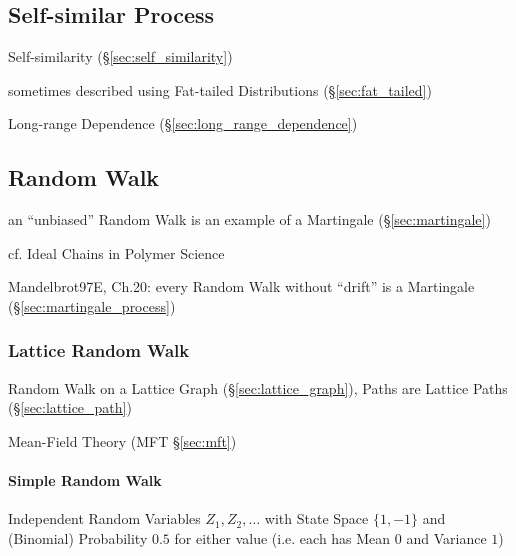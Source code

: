 \subsection{Self-similar Process}\label{sec:self_similar}

Self-similarity (\S\ref{sec:self_similarity})

sometimes described using Fat-tailed Distributions (\S\ref{sec:fat_tailed})

Long-range Dependence (\S\ref{sec:long_range_dependence})



\subsection{Random Walk}\label{sec:random_walk}


an ``unbiased'' Random Walk is an example of a Martingale
(\S\ref{sec:martingale})

cf. Ideal Chains in Polymer Science

Mandelbrot97E, Ch.20: every Random Walk without ``drift'' is a Martingale
(\S\ref{sec:martingale_process})



\subsubsection{Lattice Random Walk}\label{sec:lattice_random_walk}

Random Walk on a Lattice Graph (\S\ref{sec:lattice_graph}), Paths are Lattice
Paths (\S\ref{sec:lattice_path})

\fist Mean-Field Theory (MFT \S\ref{sec:mft})



\paragraph{Simple Random Walk}\label{sec:simple_random_walk}\hfill

Independent Random Variables $Z_1, Z_2, \ldots$ with State Space $\{1, -1\}$ and
(Binomial) Probability $0.5$ for either value (i.e. each has Mean $0$ and
Variance $1$)

